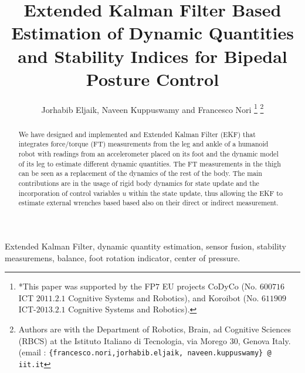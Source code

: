 \documentclass[letterpaper, 10 pt, conference]{ieeeconf}  %
\title{\LARGE \bf
Extended Kalman Filter Based Estimation of Dynamic Quantities and Stability Indices for Bipedal Posture Control}
\author{Jorhabib Eljaik, Naveen Kuppuswamy and Francesco Nori%
\thanks{*This paper was supported by the FP$7$ EU projects CoDyCo (No. $600716$ ICT $2011.2.1$ Cognitive Systems and Robotics), and Koroibot (No. $611909$ ICT-$2013.2.1$ Cognitive Systems and Robotics). }%
\thanks{Authors are with the Department of Robotics, Brain, ad Cognitive Sciences (RBCS) at the Istituto Italiano di Tecnologia, via Morego 30, Genova Italy.  ({email : \tt\small \{francesco.nori,jorhabib.eljaik, naveen.kuppuswamy\} @ iit.it}}%
 }
\begin{document}
\maketitle
\thispagestyle{empty}
\pagestyle{empty}

\begin{abstract}
 We have designed and implemented and Extended Kalman Filter (EKF) that integrates force/torque (FT) measurements from the leg and ankle of a humanoid robot with readings from an accelerometer placed on its foot and the dynamic model of its leg to estimate different dynamic quantities. The FT measurements in the thigh can be seen as a replacement of the dynamics of the rest of the body. The main contributions are in the usage of rigid body dynamics for state update and the incorporation of control variables $u$ within the state update, thus allowing the EKF to estimate external wrenches based based also on their direct or indirect measurement.
 \end{abstract}
 
\begin{keywords}
 Extended Kalman Filter, dynamic quantity estimation, sensor fusion, stability measuremens, balance, foot rotation indicator, center of pressure.
\end{keywords}



\end{document}
